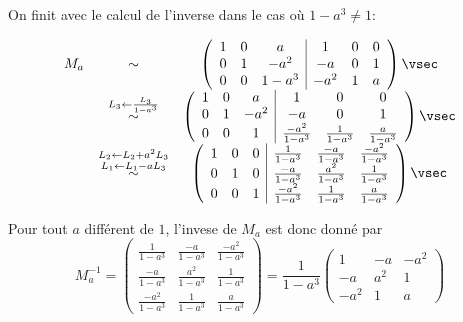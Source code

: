 \begin{correction}
On finit avec le calcul de l'inverse dans le cas où $1-a^3 \neq 1$: 

$$
\begin{array}{ccc}
 M_a 
& \sim &
\left( 
\begin{array}{ccc|ccc}
1 & 0 & a &1 & 0 & 0\\
0 & 1 & -a^2&  -a& 0 & 1\\
0 & 0 & 1-a^3&-a^2 & 1 & a
\end{array}
\right) \vsec \\
& \stackrel{L_3\leftarrow \frac{L_3}{1-a^3} }{\sim} &
\left( 
\begin{array}{ccc|ccc}
1 & 0 & a &1 & 0 & 0\\
0 & 1 & -a^2&  -a& 0 & 1\\
0 & 0 & 1 &\frac{-a^2}{1-a^3} & \frac{1}{1-a^3}  & \frac{a}{1-a^3} 
\end{array}
\right) \vsec \\

& \stackrel{L_2\leftarrow L_2+a^2L_3 }{\stackrel{L_1\leftarrow L_1-aL_3 }{\sim} } &
\left( 
\begin{array}{ccc|ccc}
1 & 0 & 0 &  \frac{1}{1-a^3} &  \frac{-a}{1-a^3} &  \frac{-a^2}{1-a^3}\\
0 & 1 & 0&   \frac{-a}{1-a^3}&  \frac{a^2}{1-a^3} &  \frac{1}{1-a^3}\\
0 & 0 & 1 &\frac{-a^2}{1-a^3} & \frac{1}{1-a^3}  & \frac{a}{1-a^3} 
\end{array}
\right) \vsec \\


\end{array}
$$

Pour tout $a$ différent de $1$, l'invese de $M_a$ est donc donné par  
$$M_a^{-1} = \left( 
\begin{array}{ccc}
\frac{1}{1-a^3} &  \frac{-a}{1-a^3} &  \frac{-a^2}{1-a^3}\\
  \frac{-a}{1-a^3}&  \frac{a^2}{1-a^3} &  \frac{1}{1-a^3}\\
\frac{-a^2}{1-a^3} & \frac{1}{1-a^3}  & \frac{a}{1-a^3} 
\end{array}
\right) =  \frac{1}{1-a^3}\left( 
\begin{array}{ccc}
1 &  -a &  -a^2\\
  -a&  a^2&  1\\
-a^2& 1& a
\end{array}
\right) $$



\end{correction}




